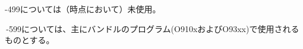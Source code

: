 \begin{hosoku}
-\ttNum499については（\dateUnusedVariables 時点において）未使用。
\end{hosoku}



\clearpage
\,-\ttNum599については、主にバンドルのプログラム(O910xおよびO93xx)で使用されるものとする。\\


